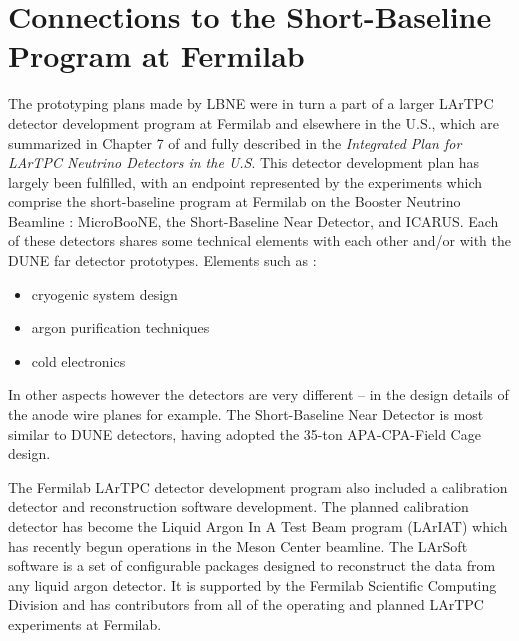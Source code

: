 \section{Connections to the Short-Baseline Program at Fermilab} 
\label{sec:proto-cern-single}


The prototyping plans made by LBNE were in turn a part of a larger LArTPC detector development program at Fermilab and elsewhere in the U.S., which are summarized in Chapter 7 of \anxlbnefd and fully described in the \textit{Integrated Plan for LArTPC Neutrino Detectors in the U.S}.
This detector development plan has largely been fulfilled, with an endpoint represented by the experiments which comprise the short-baseline program at Fermilab on the Booster Neutrino Beamline : MicroBooNE, the Short-Baseline Near Detector, and ICARUS.
 Each of these detectors shares some technical elements with each other and/or with the DUNE far detector prototypes. Elements such as :
\begin{itemize}
\item cryogenic system design
\item argon purification techniques
\item cold electronics
\end{itemize}
In other aspects however the detectors are very different -- in the design details of the anode wire planes for example.  The Short-Baseline Near Detector is most similar to DUNE detectors, having adopted the 35-ton APA-CPA-Field Cage design.

The Fermilab LArTPC detector development program also included a calibration detector and reconstruction software development.  The planned calibration detector has become the Liquid Argon In A Test Beam program (LArIAT) which has recently begun operations in the Meson Center beamline.  The LArSoft software is a set of configurable packages designed to reconstruct the data from any liquid argon detector.  It is supported by the Fermilab Scientific Computing Division and has contributors from all of the operating and planned LArTPC experiments at Fermilab.